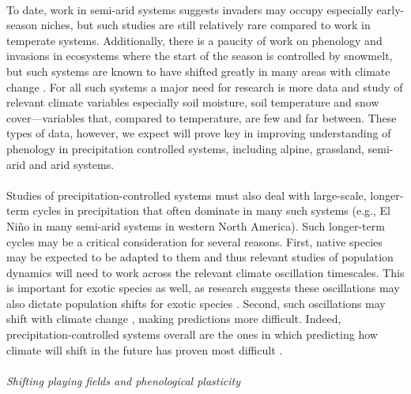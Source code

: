 \documentclass[11pt,a4paper,oneside]{article}
\begin{document}
\\
To date, work in semi-arid systems suggests invaders may occupy especially early-season niches, but such studies are still relatively rare compared to work in temperate systems. Additionally, there is a paucity of work on phenology and invasions in ecosystems where the start of the season is controlled by snowmelt, but such systems are known to have shifted greatly in many areas with climate change \citep[e.g.,][]{pederson2011}. For all such systems a major need for research is more data and study of relevant climate variables especially soil moisture, soil temperature and snow cover---variables that, compared to temperature, are few and far between. These types of data, however, we expect will prove key in improving understanding of phenology in precipitation controlled systems, including alpine, grassland, semi-arid and arid systems.  \\
\\
Studies of precipitation-controlled systems must also deal with large-scale, longer-term cycles in precipitation that often dominate in many such systems (e.g., El Ni\~{n}o in many semi-arid systems in western North America). Such longer-term cycles may be a critical consideration for several reasons. First, native species may be expected to be adapted to them and thus relevant studies of population dynamics will need to work across the relevant climate oscillation timescales. This is important for exotic species as well, as research suggests these oscillations may also dictate population shifts for exotic species \citep{Salo:2005eo}. Second, such oscillations may shift with climate change \citep{ipccPhys2007}, making predictions more difficult. Indeed, precipitation-controlled systems overall are the ones in which predicting how climate will shift in the future has proven most difficult \citep{knutti2013}.\\
\\
\noindent \emph{Shifting playing fields and phenological plasticity}\\
\end{document}
